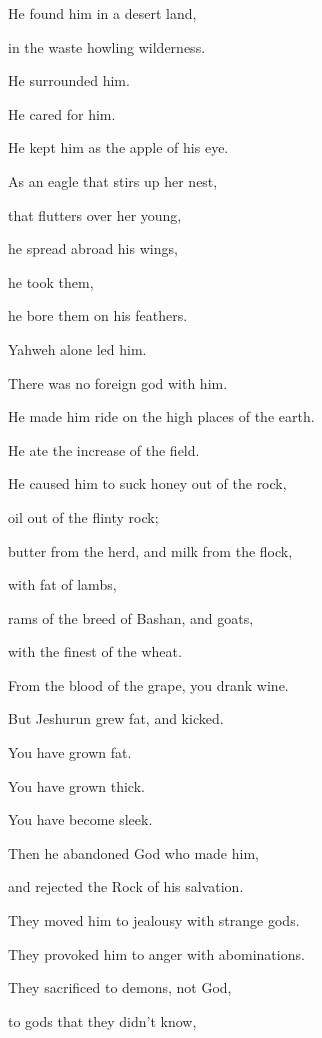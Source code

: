 {\par }{\Q {}He found him in a desert land,
\par }{\QB in the waste howling wilderness.
\par }{\Q He surrounded him.
\par }{\QB He cared for him.
\par }{\QB He kept him as the apple of his eye.
\par }{\Q {}As an eagle that stirs up her nest,
\par }{\QB that flutters over her young,
\par }{\Q he spread abroad his wings,
\par }{\QB he took them,
\par }{\QB he bore them on his feathers.
\par }{\Q {}Yahweh alone led him.
\par }{\QB There was no foreign god with him.
\par }{\Q {}He made him ride on the high places of the earth.
\par }{\QB He ate the increase of the field.
\par }{\Q He caused him to suck honey out of the rock,
\par }{\QB oil out of the flinty rock;
\par }{\Q {}butter from the herd, and milk from the flock,
\par }{\QB with fat of lambs,
\par }{\QB rams of the breed of Bashan, and goats,
\par }{\QB with the finest of the wheat.
\par }{\QB From the blood of the grape, you drank wine.
\par }{\Q {}But Jeshurun grew fat, and kicked.
\par }{\QB You have grown fat.
\par }{\QB You have grown thick.
\par }{\QB You have become sleek.
\par }{\Q Then he abandoned God who made him,
\par }{\QB and rejected the Rock of his salvation.
\par }{\Q {}They moved him to jealousy with strange gods.
\par }{\QB They provoked him to anger with abominations.
\par }{\Q {}They sacrificed to demons, not God,
\par }{\QB to gods that they didn’t know,
}
